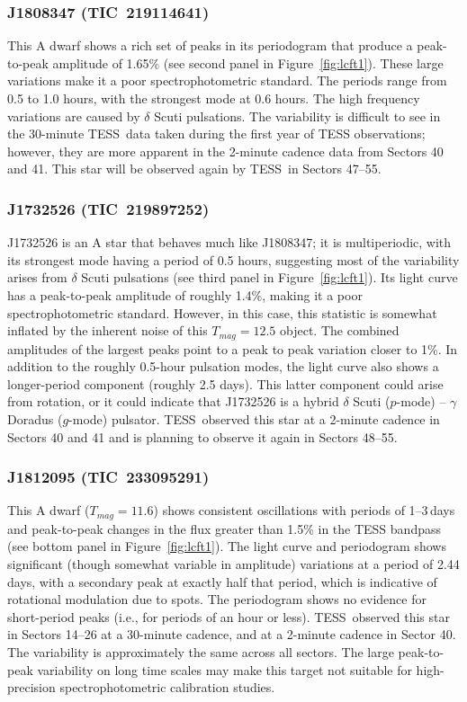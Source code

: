 \documentclass[twocolumn]{aastex631}
\newcommand{\tess}{TESS}
\begin{document}
\subsubsection{J1808347 (TIC~219114641)}

This A dwarf shows a rich set of peaks in its periodogram that produce a peak-to-peak amplitude of 1.65\% (see second panel in Figure~\ref{fig:lcft1}). These large variations  make it a poor spectrophotometric standard. The periods range from 0.5 to 1.0 hours, with the strongest mode at 0.6 hours.  The high frequency variations are caused by $\delta$ Scuti pulsations.  The variability is difficult to see in the 30-minute \tess\ data taken during the first year of TESS observations; however, they are more apparent in the 2-minute cadence data from Sectors 40 and 41.  This star will be observed again by \tess\ in Sectors 47--55.  


\subsubsection{J1732526 (TIC~219897252)}

J1732526 is an A star that behaves much like J1808347; it is multiperiodic, with its strongest mode having a period of 0.5 hours, suggesting most of the variability arises from $\delta$ Scuti pulsations (see third panel in Figure~\ref{fig:lcft1}). Its light curve has a peak-to-peak amplitude of roughly 1.4\%, making it a poor spectrophotometric standard. However, in this case, this statistic is somewhat inflated by the inherent noise of this $T_{mag}=12.5$ object. The combined amplitudes of the largest peaks point to a peak to peak variation closer to 1\%.  In addition to the roughly 0.5-hour pulsation modes, the light curve also shows a longer-period component (roughly 2.5 days). This latter component could arise from rotation, or it could indicate that J1732526 is a hybrid $\delta$ Scuti ($p$-mode) -- $\gamma$ Doradus ($g$-mode) pulsator. \tess\ observed this star at a 2-minute cadence in Sectors 40 and 41 and is planning to observe it again in Sectors 48--55.


\subsubsection{J1812095 (TIC~233095291)}

This A dwarf ($T_{mag}=11.6$) shows consistent oscillations with periods of 1--3\,days and peak-to-peak changes in the flux greater than 1.5\% in the TESS bandpass (see bottom panel in Figure~\ref{fig:lcft1}).  The light curve and periodogram shows significant (though somewhat variable in amplitude) variations at a period of 2.44 days, with a secondary peak at exactly half that period, which is indicative of rotational modulation due to spots.  The periodogram shows no evidence for short-period peaks (i.e., for periods of an hour or less).  \tess\ observed this star in Sectors 14--26 at a 30-minute cadence, and at a 2-minute cadence in Sector 40.  The variability is approximately the same across all sectors. The large peak-to-peak variability on long time scales may make this target not suitable for high-precision spectrophotometric calibration studies.
\end{document}
